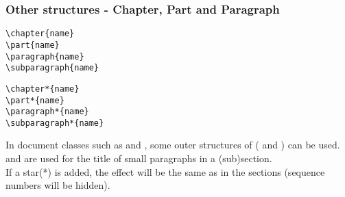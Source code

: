 \begin{frame}[fragile]
	\frametitle{Other structures - Chapter, Part and Paragraph}
	\begin{command}
		\begin{multicols}{2}
			\begin{verbatim}
\chapter{name}
\part{name}
\paragraph{name}
\subparagraph{name}
			\end{verbatim}
			\begin{verbatim}
\chapter*{name}
\part*{name}
\paragraph*{name}
\subparagraph*{name}
			\end{verbatim}
		\end{multicols}
		\vspace{-0.5em}
	\end{command}
	In document classes such as  and , some outer structures of  (\LC{\chapter} and \LC{\part}) can be used. \\[0.5em]
	\LC{\paragraph} and \LC{\subparagraph} are used for the title of small paragraphs in a (sub)section.\\[0.5em]
	If a star(\alert{*}) is added, the effect will be the same as in the sections (sequence numbers will be hidden).
\end{frame}

